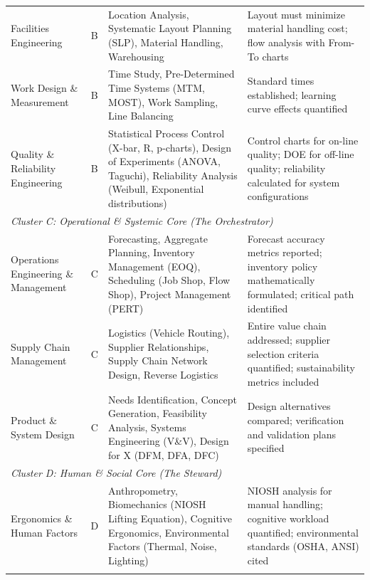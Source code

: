\documentclass[12pt,a4paper]{article}
\begin{document}
\begin{table}[h]
\begin{tabular}{@{}p{3.5cm}cp{4cm}p{5cm}@{}}
Facilities Engineering & B & Location Analysis, Systematic Layout Planning (SLP), Material Handling, Warehousing & Layout must minimize material handling cost; flow analysis with From-To charts \\
\addlinespace

Work Design \& Measurement & B & Time Study, Pre-Determined Time Systems (MTM, MOST), Work Sampling, Line Balancing & Standard times established; learning curve effects quantified \\
\addlinespace

Quality \& Reliability Engineering & B & Statistical Process Control (X-bar, R, p-charts), Design of Experiments (ANOVA, Taguchi), Reliability Analysis (Weibull, Exponential distributions) & Control charts for on-line quality; DOE for off-line quality; reliability calculated for system configurations \\
\midrule

\multicolumn{4}{l}{\textit{Cluster C: Operational \& Systemic Core (The Orchestrator)}} \\
\midrule

Operations Engineering \& Management & C & Forecasting, Aggregate Planning, Inventory Management (EOQ), Scheduling (Job Shop, Flow Shop), Project Management (PERT) & Forecast accuracy metrics reported; inventory policy mathematically formulated; critical path identified \\
\addlinespace

Supply Chain Management & C & Logistics (Vehicle Routing), Supplier Relationships, Supply Chain Network Design, Reverse Logistics & Entire value chain addressed; supplier selection criteria quantified; sustainability metrics included \\
\addlinespace

Product \& System Design & C & Needs Identification, Concept Generation, Feasibility Analysis, Systems Engineering (V\&V), Design for X (DFM, DFA, DFC) & Design alternatives compared; verification and validation plans specified \\
\midrule

\multicolumn{4}{l}{\textit{Cluster D: Human \& Social Core (The Steward)}} \\
\midrule

Ergonomics \& Human Factors & D & Anthropometry, Biomechanics (NIOSH Lifting Equation), Cognitive Ergonomics, Environmental Factors (Thermal, Noise, Lighting) & NIOSH analysis for manual handling; cognitive workload quantified; environmental standards (OSHA, ANSI) cited \\
\addlinespace


\end{tabular}
\end{table}
\end{document}
